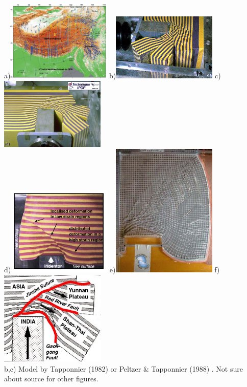 \begin{center}
a)\includegraphics[width=5cm]{images/benchmark_punch/gps}
b)\includegraphics[width=5cm]{images/benchmark_punch/img5}
c)\includegraphics[width=5cm]{images/benchmark_punch/img7}\\
d)\includegraphics[width=5cm]{images/benchmark_punch/img6}
e)\includegraphics[width=5cm]{images/benchmark_punch/img8}
f)\includegraphics[width=5cm]{images/benchmark_punch/img11}\\
{\captionfont b,c) Model by Tapponnier \etal (1982) \cite{tapl82} or 
Peltzer \& Tapponnier (1988) \cite{peta88}. Not sure about source for other figures.}
\end{center}
